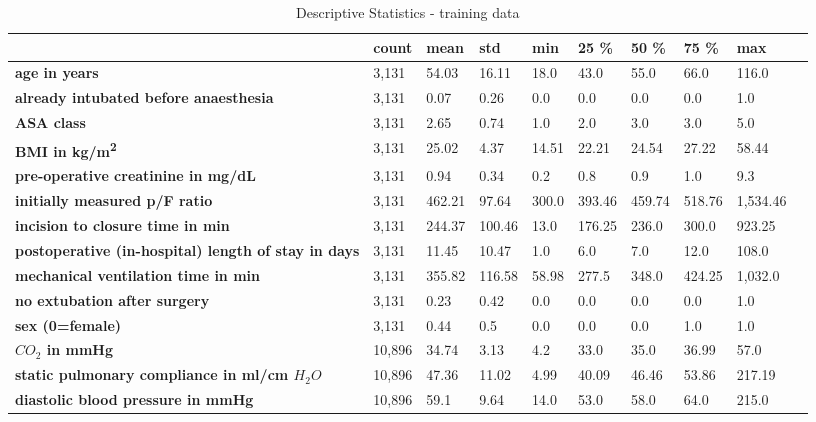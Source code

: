 \documentclass[referee,lineno,pdflatex,sn-nature]{sn-jnl}%
\theoremstyle{thmstyleone}%
\theoremstyle{thmstyletwo}%
\theoremstyle{thmstylethree}%
\begin{document}
\begin{appendices}
\begin{table}
    \centering
    \caption{Descriptive Statistics - training data}%
    \begin{tabularx}{\textwidth}{@{} L lllllllll @{}}
    \toprule
        \textbf{} & \textbf{count} & \textbf{mean} & \textbf{std} & \textbf{min} & \textbf{25 \%} & \textbf{50 \%} & \textbf{75 \%} & \textbf{max} \\ 
        \midrule
        \textbf{\footnotemark[1]age in years} & 3,131 & 54.03 & 16.11 & 18.0 & 43.0 & 55.0 & 66.0 & 116.0 \\
        \textbf{\footnotemark[1]already intubated before anaesthesia} & 3,131 & 0.07 & 0.26 & 0.0 & 0.0 & 0.0 & 0.0 & 1.0 \\
        \textbf{\footnotemark[1]ASA class} & 3,131 & 2.65 & 0.74 & 1.0 & 2.0 & 3.0 & 3.0 & 5.0 \\
        \textbf{\footnotemark[1]BMI in kg/m\textsuperscript{2}} & 3,131 & 25.02 & 4.37 & 14.51 & 22.21 & 24.54 & 27.22 & 58.44 \\ 
        \textbf{\footnotemark[1]pre-operative creatinine in mg/dL} & 3,131 & 0.94 & 0.34 & 0.2 & 0.8 & 0.9 & 1.0 & 9.3 \\ 
        \textbf{\footnotemark[1]initially measured p/F ratio} & 3,131 & 462.21 & 97.64 & 300.0 & 393.46 & 459.74 & 518.76 & 1,534.46 \\ 
        \textbf{\footnotemark[1]incision to closure time in min} & 3,131 & 244.37 & 100.46 & 13.0 & 176.25 & 236.0 & 300.0 & 923.25 \\ 
        \textbf{\footnotemark[1]postoperative (in-hospital) length of stay in days} & 3,131 & 11.45 & 10.47 & 1.0 & 6.0 & 7.0 & 12.0 & 108.0 \\ 
        \textbf{\footnotemark[1]mechanical ventilation time in min} & 3,131 & 355.82 & 116.58 & 58.98 & 277.5 & 348.0 & 424.25 & 1,032.0 \\ 
        \textbf{\footnotemark[1]no extubation after surgery} & 3,131 & 0.23 & 0.42 & 0.0 & 0.0 & 0.0 & 0.0 & 1.0 \\ 
        \textbf{\footnotemark[1]sex (0=female)} & 3,131 & 0.44 & 0.5 & 0.0 & 0.0 & 0.0 & 1.0 & 1.0 \\ 
        \textbf{\footnotemark[2]$CO_2$ in mmHg} & 10,896 & 34.74 & 3.13 & 4.2 & 33.0 & 35.0 & 36.99 & 57.0 \\ 
        \textbf{\footnotemark[2]static pulmonary compliance in ml/cm $H_2O$} & 10,896 & 47.36 & 11.02 & 4.99 & 40.09 & 46.46 & 53.86 & 217.19 \\ 
        \textbf{\footnotemark[2]diastolic blood pressure in mmHg} & 10,896 & 59.1 & 9.64 & 14.0 & 53.0 & 58.0 & 64.0 & 215.0 \\ 

\end{tabularx}
\end{table}
\end{appendices}
\end{document}
